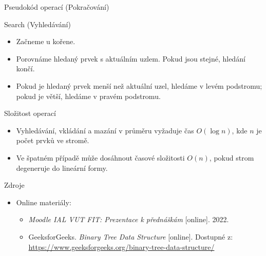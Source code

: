 \documentclass{beamer}
\begin{document}
\begin{frame}{Pseudokód operací (Pokračování)}
    \begin{block}{Search (Vyhledávání)}
        \begin{itemize}
              \item Začneme u kořene.
              \item Porovnáme hledaný prvek s aktuálním uzlem. Pokud jsou stejné, hledání končí.
              \item Pokud je hledaný prvek menší než aktuální uzel, hledáme v levém podstromu; pokud je větší, hledáme v pravém podstromu.
        \end{itemize}
    \end{block}
\end{frame}

\begin{frame}{Složitost operací}
    \begin{itemize}
        \item Vyhledávání, vkládání a mazání v průměru vyžaduje čas \(O(\log n)\), kde \(n\) je počet prvků ve stromě.
        \item Ve špatném případě může dosáhnout časové složitosti \(O(n)\), pokud strom degeneruje do lineární formy.
    \end{itemize}
\end{frame}

\begin{frame}{Zdroje}
    \begin{itemize}
        \item Online materiály:
        \begin{itemize}
            \item \textit{Moodle IAL VUT FIT: Prezentace k přednáškám} [online]. 2022.
        \end{itemize}
        \begin{itemize}
            \item GeeksforGeeks. \textit{Binary Tree Data Structure} [online]. Dostupné z: \\
            \href{https://www.geeksforgeeks.org/binary-tree-data-structure/}{https://www.geeksforgeeks.org/binary-tree-data-structure/}
        \end{itemize}
    \end{itemize}
\end{frame}
\end{document}
